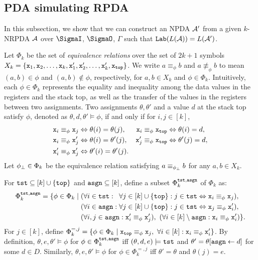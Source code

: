 \subsection{PDA simulating RPDA}

In this subsection, we show that we can construct an NPDA ${\cal A}'$
from a given $k$-NRPDA ${\cal A}$ over $\SigmaI$, $\SigmaO$, $\Gamma$
such that $\mathtt{Lab}(L({\cal A}))=L({\cal A}')$.

Let $\Phi_k$ be the set of
\emph{equivalence relations}
over the set of $2k+1$ symbols
$X_k=\{
 {\tt x}_1,{\tt x}_2,\ldots,{\tt x}_k,
 {\tt x}'_1,{\tt x}'_2,\ldots,{\tt x}'_k,
 {\tt x}_{\mathtt{top}} \}$.
 We write $a\equiv_{\phi}b$ and $a\not\equiv_{\phi}b$ to mean
 $(a,b)\in\phi$ and $(a,b)\notin\phi$, respectively,
for $a,b\in X_k$ and $\phi\in\Phi_k$.
%
Intuitively,
each $\phi\in\Phi_k$ represents the equality and inequality
among the data values in the registers and the stack top,
as well as the transfer of the values in the registers
between two assignments.
Two assignments $\theta,\theta'$ and a value $d$ at the stack top
satisfy $\phi$,
denoted as $\theta,d,\theta'\models\phi$,
if and only if for $i,j\in[k]$,
\begin{align*}
  {\tt x}_i\equiv_{\phi}{\tt x}_j &\Leftrightarrow \theta(i)=\theta(j),
  & {\tt x}_i\equiv_{\phi}{\tt x}_{\mathtt{top}} &\Leftrightarrow \theta(i)=d, \\
  {\tt x}_i\equiv_{\phi}{\tt x}'_j &\Leftrightarrow \theta(i)=\theta'(j),
  & {\tt x}'_j\equiv_{\phi}{\tt x}_{\mathtt{top}} &\Leftrightarrow \theta'(j)=d , \\
  {\tt x}'_i\equiv_{\phi}{\tt x}'_j &\Leftrightarrow \theta'(i)=\theta'(j).
\end{align*}
%
Let $\phi_{\bot}\in\Phi_k$ be the equivalence relation
satisfying $a\equiv_{\phi_{\bot}}b$ for any $a,b\in X_k$.

For $\mathtt{tst}\subseteq [k]\cup\{\mathtt{top}\}$ and $\mathtt{asgn}\subseteq [k]$,
define a subset $\Phi_k^{\mathtt{tst},\mathtt{asgn}}$ of $\Phi_k$ as:
\[
  \Phi_k^{\tst,\asgn} = \{ \phi\in\Phi_k \mid
    \begin{aligned}[t]
      & (\forall i\in\rlap{$\tst :{}$}\hphantom{\asgn:{}}
      \forall j\in [k]\cup\{\top\} :
      j\in\tst \Leftrightarrow \L_i \equiv_{\phi} \L_j), \\
      & (\forall i\in\asgn : \forall j\in [k]\cup\{\top\} :
      j\in\tst \Leftrightarrow \L_j \equiv_{\phi} \R_i), \\
      & (\forall i,j\in\asgn :
      \R_i \equiv_{\phi} \R_j), \
       (\forall i\in [k]\setminus\asgn :
      \L_i \equiv_{\phi} \R_i)\}.
    \end{aligned}
\]
For $j\in[k]$, define
$
  \Phi_k^{=,j} = \{ \phi\in\Phi_k \mid
    {\tt x}_{\mathtt{top}} \equiv_{\phi} {\tt x}_j, \
    \forall i\in[k] : {\tt x}_i \equiv_{\phi} {\tt x}'_i \}
$.
By definition,
$\theta,e,\theta'\models\phi$ for
$\phi\in\Phi_k^{\mathtt{tst},\mathtt{asgn}}$
iff
$(\theta,d,e)\models\mathtt{tst}$ and
$\theta'=\theta[\mathtt{asgn}\gets d]$ for some $d\in D$.
Similarly,
$\theta,e,\theta'\models\phi$ for
$\phi\in\Phi_k^{=,j}$
iff
$\theta'=\theta$ and $\theta(j)=e$.

